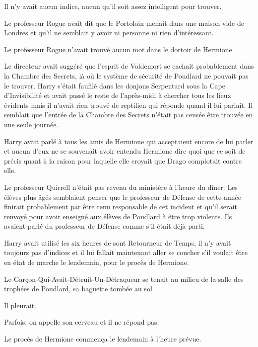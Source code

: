 Il n'y avait aucun indice, aucun qu'il soit assez intelligent pour trouver.

Le professeur Rogue avait dit que le Portoloin menait dans une maison vide de Londres et qu'il ne semblait y avoir ni personne ni rien d'intéressant.

Le professeur Rogue n'avait trouvé aucun mot dans le dortoir de Hermione.

Le directeur avait suggéré que l'esprit de Voldemort se cachait probablement dans la Chambre des Secrets, là où le système de sécurité de Poudlard ne pouvait pas le trouver. Harry s'était faufilé dans les donjons Serpentard sous la Cape d'Invisibilité et avait passé le reste de l'après-midi à chercher tous les lieux évidents mais il n'avait rien trouvé de reptilien qui réponde quand il lui parlait. Il semblait que l'entrée de la Chambre des Secrets n'était pas censée être trouvée en une seule journée.

Harry avait parlé à tous les amis de Hermione qui acceptaient encore de lui parler et aucun d'eux ne se souvenait avoir entendu Hermione dire quoi que ce soit de précis quant à la raison pour laquelle elle croyait que Drago complotait contre elle.

Le professeur Quirrell n'était pas revenu du ministère à l'heure du dîner. Les élèves plus âgés semblaient penser que le professeur de Défense de cette année finirait probablement par être tenu responsable de cet incident et qu'il serait renvoyé pour avoir enseigné aux élèves de Poudlard à être trop violents. Ils avaient parlé du professeur de Défense comme s'il était déjà parti.

Harry avait utilisé les six heures de sont Retourneur de Temps, il n'y avait toujours pas d'indices et il lui fallait maintenant aller se coucher s'il voulait être en état de marche le lendemain, pour le procès de Hermione.

Le Garçon-Qui-Avait-Détruit-Un-Détraqueur se tenait au milieu de la salle des trophées de Poudlard, sa baguette tombée au sol.

Il pleurait.

Parfois, on appelle son cerveau et il ne répond pas.

Le procès de Hermione commença le lendemain à l'heure prévue.
